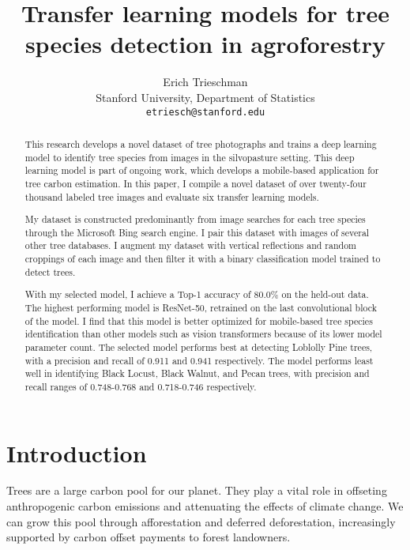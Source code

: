 \documentclass[10pt,twocolumn,letterpaper]{article}
\begin{document}
\title{Transfer learning models for tree species detection in agroforestry}

\author{Erich Trieschman\\
Stanford University, Department of Statistics\\
{\tt\small etriesch@stanford.edu}
}
\maketitle

\begin{abstract}
  This research develops a novel dataset of tree photographs and trains a deep learning model to identify tree species from images in the silvopasture setting. This deep learning model is part of ongoing work, which develops a mobile-based application for tree carbon estimation. In this paper, I compile a novel dataset of over twenty-four thousand labeled tree images and evaluate six transfer learning models. 
  
  My dataset is constructed predominantly from image searches for each tree species through the Microsoft Bing search engine. I pair this dataset with images of several other tree databases. I augment my dataset with vertical reflections and random croppings of each image and then filter it with a binary classification model trained to detect trees.
  
  With my selected model, I achieve a Top-1 accuracy of 80.0\% on the held-out data. The highest performing model is ResNet-50, retrained on the last convolutional block of the model. I find that this model is better optimized for mobile-based tree species identification than other models such as vision transformers because of its lower model parameter count. The selected model performs best at detecting Loblolly Pine trees, with a precision and recall of 0.911 and 0.941 respectively. The model performs least well in identifying Black Locust, Black Walnut, and Pecan trees, with precision and recall ranges of 0.748-0.768 and 0.718-0.746 respectively.
\end{abstract}

\section{Introduction}
\label{sec:intro}
Trees are a large carbon pool for our planet. They play a vital role in offseting anthropogenic carbon emissions and attenuating the effects of climate change. We can grow this pool through afforestation and deferred deforestation, increasingly supported by carbon offset payments to forest landowners. 
\end{document}
